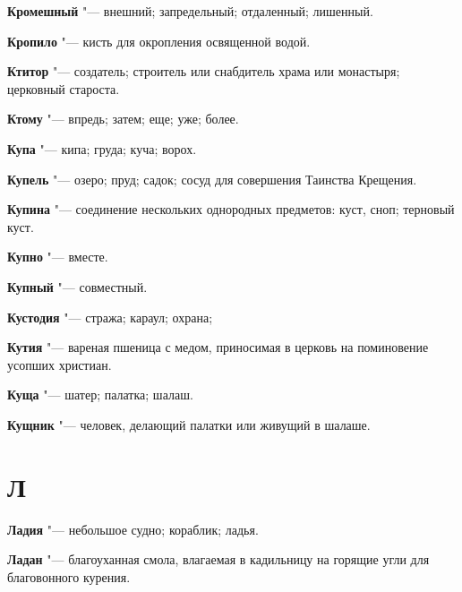 \begin{mymulticols}{2}
\noindent\textbf{Кромешный} "--- внешний; запредельный; отдаленный; лишенный. 




\noindent\textbf{Кропило} "--- кисть для окропления освященной водой. 




\noindent\textbf{Ктитор} "--- создатель; строитель или снабдитель храма или монастыря; церковный староста. 




\noindent\textbf{Ктому} "--- впредь; затем; еще; уже; более. 




\noindent\textbf{Купа} "--- кипа; груда; куча; ворох. 




\noindent\textbf{Купель} "--- озеро; пруд; садок; сосуд для совершения Таинства Крещения. 




\noindent\textbf{Купина} "--- соединение нескольких однородных предметов: куст, сноп; терновый куст. 




\noindent\textbf{Купно} "--- вместе. 




\noindent\textbf{Купный} "--- совместный. 




\noindent\textbf{Кустодия} "--- стража; караул; охрана; 




\noindent\textbf{Кутия} "--- вареная пшеница с медом, приносимая в церковь на поминовение усопших христиан. 




\noindent\textbf{Куща} "--- шатер; палатка; шалаш. 




\noindent\textbf{Кущник} "--- человек, делающий палатки или живущий в шалаше. 




\section{Л}





\noindent\textbf{Ладия} "--- небольшое судно; кораблик; ладья. 




\noindent\textbf{Ладан} "--- благоуханная смола, влагаемая в кадильницу на горящие угли для благовонного курения. 





\end{mymulticols}
